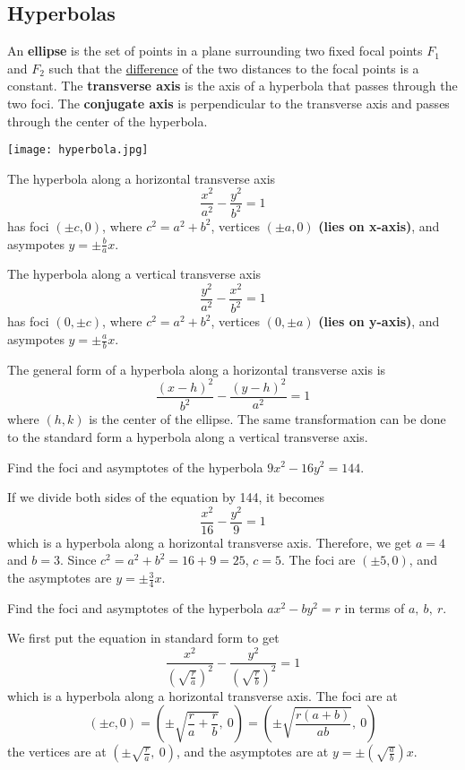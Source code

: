   \subsection*{Hyperbolas}
    An \textbf{ellipse} is the set of points in a plane surrounding two fixed focal points $F_1$ and $F_2$ such that the \underline{difference} of the two distances to the focal points is a constant. The \textbf{transverse axis} is the axis of a hyperbola that passes through the two foci. The \textbf{conjugate axis} is perpendicular to the transverse axis and passes through the center of the hyperbola.
    \begin{center}
      \texttt{[image: hyperbola.jpg]}
    \end{center}
    \begin{definition}
      The hyperbola along a horizontal transverse axis
      $$\frac{x^2}{a^2}-\frac{y^2}{b^2}=1$$
      has foci $(\pm c,0)$, where $c^2=a^2 + b^2$, vertices $(\pm a,0)$ \textbf{(lies on x-axis)}, and asympotes $y=\pm\frac{b}{a}x$.
    \end{definition}
    \begin{definition}
      The hyperbola along a vertical transverse axis
      $$\frac{y^2}{a^2}-\frac{x^2}{b^2}=1$$
      has foci $(0, \pm c)$, where $c^2=a^2 + b^2$, vertices $(0, \pm a)$ \textbf{(lies on y-axis)}, and asympotes $y=\pm\frac{a}{b}x$.
    \end{definition}
     \begin{definition}
      The general form of a hyperbola along a horizontal transverse axis is
      $$\frac{(x-h)^2}{b^2}-\frac{(y-h)^2}{a^2}=1$$
      where $(h,k)$ is the center of the ellipse. The same transformation can be done to the standard form a hyperbola along a vertical transverse axis.
    \end{definition}
    \begin{example}
      Find the foci and asymptotes of the hyperbola ${9x^2 - 16y^2 = 144}$.
    \end{example}
    \begin{solution}
      If we divide both sides of the equation by 144, it becomes $$\frac{x^2}{16}-\frac{y^2}{9}=1$$
      which is a hyperbola along a horizontal transverse axis. Therefore, we get $a=4$ and $b=3$. Since $c^2=a^2 + b^2 = 16+9=25$, $c=5$. The foci are $(\pm 5,0)$, and the asymptotes are $y=\pm\frac{3}{4}x$.
    \end{solution}
    \begin{example}
      Find the foci and asymptotes of the hyperbola ${ax^2 - by^2 = r}$ in terms of $a,\ b,\ r$.
    \end{example}
    \begin{solution}
      We first put the equation in standard form to get
      $$\frac{x^2}{\left(\sqrt{\frac{r}{a}}\right)^2}-\frac{y^2}{\left(\sqrt{\frac{r}{b}}\right)^2}=1$$
      which is a hyperbola along a horizontal transverse axis. The foci are at
      $$(\pm c,0)= \left(\pm\sqrt{\frac{r}{a}+\frac{r}{b}},\ 0\right)=\left(\pm\sqrt{\frac{r(a+b)}{ab}},\ 0\right)$$
      the vertices are at $\left(\pm\sqrt{\frac{r}{a}},\ 0\right)$,
      and the asymptotes are at $y=\pm\left(\sqrt{\frac{a}{b}}\right)x$.
    \end{solution}